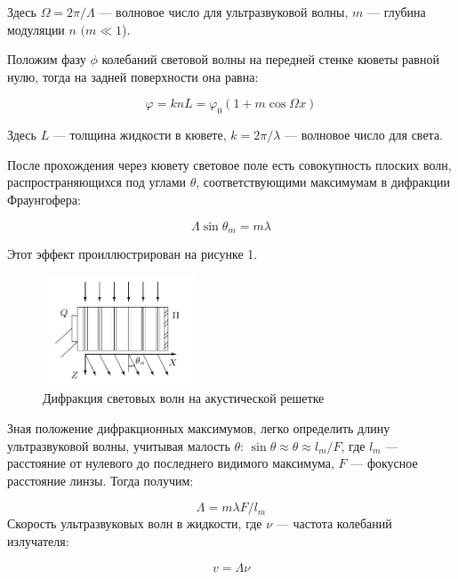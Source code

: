 \documentclass[a4paper,12pt]{article} %
\begin{document}
	Здесь $ \Omega = 2 \pi / \Lambda $ --- волновое число для ультразвуковой волны, $ m $ --- глубина модуляции $ n $ $ (m \ll 1 $).
	
	Положим фазу $ \phi $ колебаний световой волны на передней стенке кюветы равной нулю, тогда на задней поверхности она равна:
	
	\begin{equation*}
		\varphi  = k n L = \varphi_0 (1 + m \cos \Omega x)
	\end{equation*}
	
	Здесь $ L $ --- толщина жидкости в кювете, $ k = 2 \pi / \lambda $ --- волновое число для света.
	
	После прохождения через кювету световое поле есть совокупность плоских волн, распространяющихся под углами $ \theta $, соответствующими максимумам в дифракции Фраунгофера:
	
	\begin{equation*}	
		\Lambda \sin \theta_m = m \lambda
	\end{equation*}
	
	Этот эффект проиллюстрирован на рисунке 1.
	\begin{figure}[h!]
		\centering	
		\includegraphics[width=0.4\textwidth]{Pictures/image_1}
		\caption{Дифракция световых волн на акустической решетке}
		\label{diff}
	\end{figure}
	
	Зная положение дифракционных максимумов, легко определить длину ультразвуковой волны, учитывая малость $ \theta $: $ \sin \theta \approx \theta \approx l_m /F  $, где $ l_m $ --- расстояние от нулевого до последнего видимого максимума, $ F $ --- фокусное расстояние линзы. Тогда получим:
	
	\begin{equation*}
		\Lambda = m \lambda F/ l_m 
	\end{equation*}
	Скорость ультразвуковых волн в жидкости, где $ \nu $ --- частота колебаний излучателя:
	
	\begin{equation*}
		v = \Lambda \nu 
	\end{equation*}
	
\end{document}
